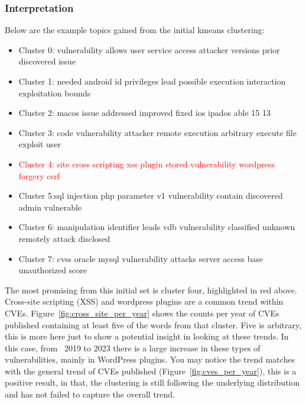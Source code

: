 \documentclass[12pt]{article}
\begin{document}
\subsubsection{Interpretation}

Below are the example topics gained from the initial kmeans clustering:
\begin{itemize}

	\item Cluster 0: vulnerability allows user service access attacker versions prior discovered issue

	\item Cluster 1: needed android id privileges lead possible execution interaction exploitation bounds

	\item Cluster 2: macos issue addressed improved fixed ios ipados able 15 13

	\item Cluster 3: code vulnerability attacker remote execution arbitrary execute file exploit user

	\item \textcolor{red}{Cluster 4: site cross scripting xss plugin stored vulnerability wordpress
		      forgery csrf}

	\item Cluster 5:sql injection php parameter v1 vulnerability contain discovered
	      admin vulnerable

	\item Cluster 6: manipulation identifier leads vdb vulnerability classified unknown remotely attack disclosed

	\item Cluster 7: cvss oracle mysql vulnerability attacks server access base unauthorized score
\end{itemize}

The most promising from this initial set is cluster four, highlighted in red above. Cross-site
scripting (XSS) and wordpress plugins are a common trend within CVEs.
Figure~\ref{fig:cross_site_per_year} shows the counts per year of CVEs published containing at least five of the
words from that cluster. Five is arbitrary, this is more here just to show a potential insight in
looking at these trends. In this case, from ~2019 to 2023 there is a large increase in these types
of vulnerabilities, mainly in WordPress plugins. You may notice the trend matches with the general
trend of CVEs published (Figure~\ref{fig:cves_per_year}), this is a positive result, in that, the clustering
is still following the underlying distribution and has not failed to capture the overall trend.
\end{document}
